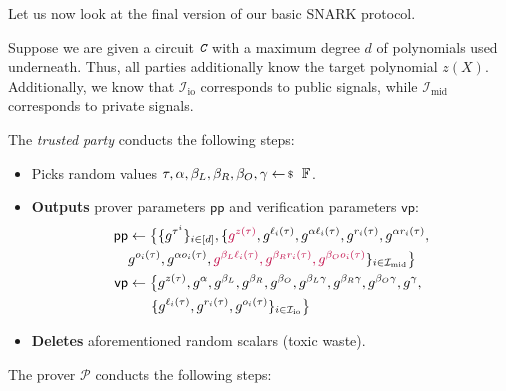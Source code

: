 \documentclass[../lecture-notes-148x210.tex]{subfiles}
\begin{document}
Let us now look at the final version of our basic SNARK protocol.

\begin{tcolorbox}[title=Attempt \#5: Turning SNARK into zk-SNARK,
    breakable,
    colback=blue!5!white,
    colframe=blue!75!black,
    colbacktitle=blue!25!white,
    coltitle=blue!20!black,
    fonttitle=\bfseries,
    boxrule=1.25pt,
    subtitle style={boxrule=0pt,
    colback=blue!20!white,
    colupper=blue!75!gray} ]
    \small
    Suppose we are given a circuit $\textit{\texttt{C}}$ with a maximum degree $d$ of polynomials used underneath. Thus, all parties additionally know the target polynomial $z(X)$. Additionally, we know that $\mathcal{I}_{\text{io}}$ corresponds to public signals, while $\mathcal{I}_{\text{mid}}$ corresponds to private signals.

    The \emph{trusted party} conducts the following steps:
    \begin{itemize}[label=]
        \item Picks random values $\tau, \alpha, \beta_L, \beta_R, \beta_O, \gamma \leftarrowS \mathbb{F}$.
        \item \textbf{Outputs} prover parameters $\mathsf{pp}$ and verification parameters $\mathsf{vp}$:
        \begin{align*}
            \mathsf{pp} &\gets \big\{\{g^{\tau^i}\}_{i \in [d]}, \{\textcolor{purple}{g^{z(\tau)}}, g^{\ell_i(\tau)}, g^{\alpha \ell_i(\tau)}, g^{r_i(\tau)}, g^{\alpha r_i(\tau)}, \\ 
                        & g^{o_i(\tau)}, g^{\alpha o_i(\tau)}, \textcolor{purple}{g^{\beta_L\ell_i(\tau)}, g^{\beta_Rr_i(\tau)}, g^{\beta_Oo_i(\tau)}}\}_{i \in \mathcal{I}_{\text{mid}}}\big\} \\
            \mathsf{vp} &\gets \big\{ g^{z(\tau)}, g^{\alpha}, g^{\beta_L}, g^{\beta_R}, g^{\beta_O}, g^{\beta_L\gamma}, g^{\beta_R\gamma}, g^{\beta_O\gamma}, g^{\gamma}, \\
                        & \;\;\;\;\;\; \{g^{\ell_i(\tau)}, g^{r_i(\tau)}, g^{o_i(\tau)}\}_{i \in \mathcal{I}_{\text{io}}} \big\}
        \end{align*}
        \item \textbf{Deletes} aforementioned random scalars (toxic waste).
    \end{itemize}
    The prover $\mathcal{P}$ conducts the following steps:
    \begin{itemize}[label=]

\end{itemize}
\end{tcolorbox}
\end{document}
